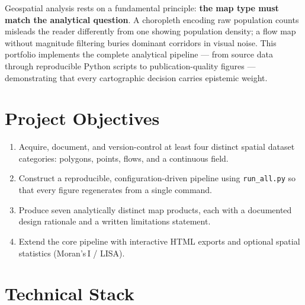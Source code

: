 \documentclass[12pt, a4paper, oneside]{report}
\begin{document}
Geospatial analysis rests on a fundamental principle: \textbf{the map type must match the
analytical question}. A choropleth encoding raw population counts misleads the reader
differently from one showing population density; a flow map without magnitude filtering
buries dominant corridors in visual noise. This portfolio implements the complete analytical
pipeline --- from source data through reproducible Python scripts to publication-quality
figures --- demonstrating that every cartographic decision carries epistemic weight.

\section{Project Objectives}

\begin{enumerate}[leftmargin=2em, label=\textcolor{accent}{\bfseries\arabic*.}]
  \item Acquire, document, and version-control at least four distinct spatial dataset
        categories: polygons, points, flows, and a continuous field.
  \item Construct a reproducible, configuration-driven pipeline using
        \texttt{run\_all.py} so that every figure regenerates from a single command.
  \item Produce seven analytically distinct map products, each with a documented
        design rationale and a written limitations statement.
  \item Extend the core pipeline with interactive HTML exports and optional spatial
        statistics (Moran's\,I / LISA).
\end{enumerate}

\section{Technical Stack}
\end{document}
